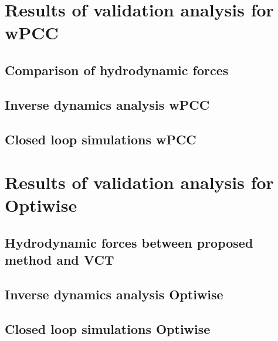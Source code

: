 \documentclass[preprint,11pt,authoryear]{elsarticle}
\begin{document}
\section{Results of validation analysis for wPCC}
\label{sec:results_wpcc}

\FloatBarrier
\subsection{Comparison of hydrodynamic forces}

\FloatBarrier

\subsection{Inverse dynamics analysis wPCC} \label{sec:result_ID_wPCC}

\FloatBarrier
\subsection{Closed loop simulations wPCC}

\FloatBarrier



\section{Results of validation analysis for Optiwise}
\label{sec:results_optiwise}

\FloatBarrier
\subsection{Hydrodynamic forces between proposed method and VCT}


\subsection{Inverse dynamics analysis Optiwise}

\FloatBarrier

\subsection{Closed loop simulations Optiwise}

\FloatBarrier

%
\end{document}

